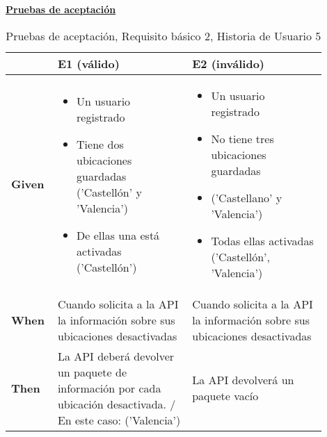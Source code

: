 \documentclass[../ei103948-project-documentation.tex]{subfiles}
\begin{document}
\begin{center}
					\textbf{\underline{Pruebas de aceptación}}
					\begin{table}[H]
						\centering
						\begin{tabular}{|p{0.10\linewidth}|p{0.40\linewidth}|p{0.40\linewidth}|}
							\hline
							\textbf{}      & \textbf{E1 (válido)}                                                                                                           & \textbf{E2 (inválido)}                                                                                                               \\ \hline
							\textbf{Given} &
							\begin{itemize}\vspace{-5mm}\setlength\itemsep{0mm}\setlength\parskip{0mm}\setlength{\itemindent}{-5mm} 
								\item Un usuario registrado
								\item Tiene dos ubicaciones guardadas ('Castellón' y 'Valencia')
								\item De ellas una está activadas ('Castellón')
							\end{itemize}& 
							\begin{itemize}\vspace{-5mm}\setlength\itemsep{0mm}\setlength\parskip{0mm}\setlength{\itemindent}{-5mm}
								\item Un usuario registrado
								\item No tiene tres ubicaciones guardadas
								\item ('Castellano' y 'Valencia')
								\item Todas ellas activadas ('Castellón', 'Valencia')
							\end{itemize}\\ \hline
							\textbf{When}  & Cuando solicita a la API la información sobre sus ubicaciones desactivadas                                                     & Cuando solicita a la API la información sobre sus ubicaciones desactivadas                                                           \\ \hline
							\textbf{Then}  & La API deberá devolver un paquete de información por cada ubicación desactivada. / En este caso: ('Valencia')                  & La API devolverá un paquete vacío                                                                                                    \\ \hline
							\end{tabular}
						\caption{Pruebas de aceptación, Requisito básico 2, Historia de Usuario 5}
					\end{table}
					\end{center}
\end{document}
